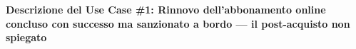 \documentclass[11pt,a4paper]{article}
\begin{document}
\vspace{0.3cm}


\newpage


\begin{tcolorbox}[colback=primaryColor!10,colframe=primaryColor,arc=2mm]
    \textbf{Descrizione del Use Case \#1: Rinnovo dell'abbonamento online concluso con successo ma sanzionato a bordo --- il post-acquisto non spiegato}
\end{tcolorbox}

\vspace{0.3cm}
\end{document}
